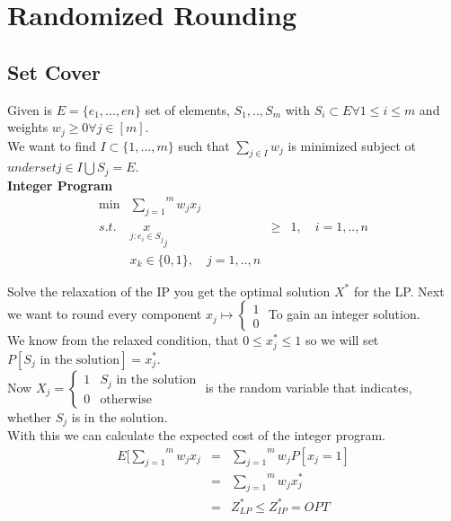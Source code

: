 \documentclass[ngerman,a4paper,11pt]{article}
\begin{document}
\section{Randomized Rounding}

\subsection{Set Cover}

Given is $E = \{ e_1, ..., en \}$ set of elements,
$S_1,..,S_m$ with $S_i \subset E \forall 1 \leq i \leq m$ and weights
$w_j \geq 0 \forall j \in [m]$.\\
We want to find $I \subset \{ 1 ,..., m \}$ such that $\underset{j \in I}{\sum} w_j$ is
minimized subject ot $underset{j \in I}{\bigcup} S_j = E$.\\

\textbf{Integer Program}\\
$$\begin{array}{rrcl}
\min & \overset{m}{\underset{j=1}{\sum}} w_j x_j &&\\
s.t. & \underset{j:e_i\in S_j}x_j & \geq & 1 , \quad i=1,..,n\\
   & x_k \in \{0,1\}, \quad j=1,..,n
\end{array}$$

Solve the relaxation of the IP you get the optimal solution $X^*$ for
the LP. Next we want to round every component $x_j \mapsto \left\{ \begin{array}{c} 1 \\ 0\end{array}\right.$
To gain an integer solution.\\

We know from the relaxed condition, that $0 \leq x_j^* \leq 1$ so we will set
$P[S_j \text{ in the solution}] = x_j^*$.\\

Now $X_j = \left\{ \begin{array}{lr} 1&S_j\text{ in the solution}\\0&\text{otherwise}\end{array}\right.$
is the random variable that indicates, whether $S_j$ is in the solution.\\

With this we can calculate the expected cost of the integer program.\\
$$\begin{array}{rcl}
E[\overset{m}{\underset{j=1}{\sum}} w_j x_j &=& \overset{m}{\underset{j=1}{\sum}} w_j P[x_j=1]\\
&=&\overset{m}{\underset{j=1}{\sum}} w_j x_j^* \\
&=& Z_{LP}^*\leq Z_{IP}^* = OPT
\end{array}$$
\end{document}
